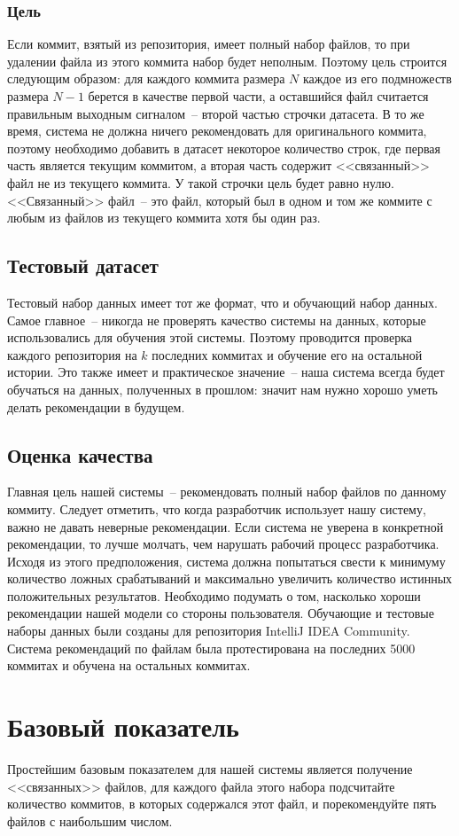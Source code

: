 \documentclass[times]{itmo-student-thesis}
\begin{document}
\subsubsection{Цель}
Если коммит, взятый из репозитория, имеет полный набор файлов, то при удалении файла из этого коммита набор будет неполным. Поэтому цель строится следующим образом: для каждого коммита размера $N$ каждое из его подмножеств размера $N - 1$ берется в качестве первой части, а оставшийся файл считается правильным выходным сигналом~-- второй частью строчки датасета. В то же время, система не должна ничего рекомендовать для оригинального коммита, поэтому необходимо добавить в датасет некоторое количество строк, где первая часть является текущим коммитом, а вторая часть содержит <<связанный>> файл не из текущего коммита. У такой строчки цель будет равно нулю. <<Связанный>> файл~-- это файл, который был в одном и том же коммите с любым из файлов из текущего коммита хотя бы один раз.
\subsection{Тестовый датасет}
Тестовый набор данных имеет тот же формат, что и обучающий набор данных. Самое главное~-- никогда не проверять качество системы на данных, которые использовались для обучения этой системы. Поэтому проводится проверка каждого репозитория на $k$ последних коммитах и обучение его на остальной истории. Это также имеет и практическое значение~-- наша система всегда будет обучаться на данных, полученных в прошлом: значит нам нужно хорошо уметь делать рекомендации в будущем.
\subsection{Оценка качества}
Главная цель нашей системы~-- рекомендовать полный набор файлов по данному коммиту. Следует отметить, что когда разработчик использует нашу систему, важно не давать неверные рекомендации. Если система не уверена в конкретной рекомендации, то лучше молчать, чем нарушать рабочий процесс разработчика. Исходя из этого предположения, система должна попытаться свести к минимуму количество ложных срабатываний и максимально увеличить количество истинных положительных результатов. Необходимо подумать о том, насколько хороши рекомендации нашей модели со стороны пользователя. Обучающие и тестовые наборы данных были созданы для репозитория IntelliJ IDEA Community. Система рекомендаций по файлам была протестирована на последних 5000 коммитах и обучена на остальных коммитах.
\section{Базовый показатель}\label{baseline}
Простейшим базовым показателем для нашей системы является получение <<связанных>> файлов, для каждого файла этого набора подсчитайте количество коммитов, в которых содержался этот файл, и порекомендуйте пять файлов с наибольшим числом. %
\end{document}
